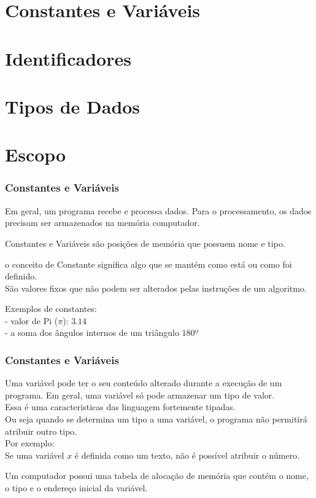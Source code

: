 \section{Constantes e Variáveis}
\section{Identificadores}
\section{Tipos de Dados}
\section{Escopo}

\begin{frame}
	\frametitle{Constantes e Variáveis}
	Em geral, um programa recebe e processa dados. Para o processamento, os dados precisam ser armazenados na memória computador.

	Constantes e Variáveis são posições de memória que possuem nome e tipo.

	o conceito de Constante significa algo que se mantém como está ou como foi definido.\\
	São valores fixos que não podem ser alterados pelas instruções de um algoritmo.

	Exemplos de constantes:\\
	- valor de Pi ($\pi$): $3.14$\\
	- a soma dos ângulos internos de um triângulo $180$º

\end{frame}


\begin{frame}
	\frametitle{Constantes e Variáveis}
	Uma variável pode ter o seu conteúdo alterado durante a execução de um programa.
	Em geral, uma variável só pode armazenar um tipo de valor.\\
	Essa é uma caracteristicas das linguagem fortemente tipadas.\\
	Ou seja quando se determina um tipo a uma variável, o programa não permitirá atribuir outro tipo.\\
	Por exemplo:\\
	Se uma variável $x$ é definida como um texto, não é possível atribuir o número. 

	Um computador possui uma tabela de alocação de memória que contém o nome, o tipo e o endereço inicial da variável.
\end{frame}


